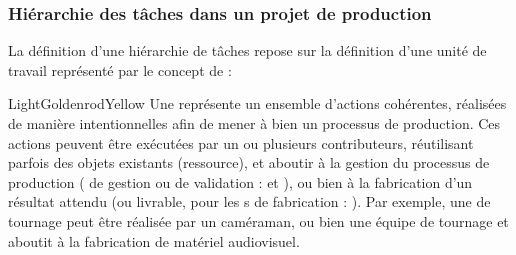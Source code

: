 \subsubsection{Hiérarchie des tâches dans un projet de production}\label{sec:mission}
La définition d'une hiérarchie de tâches repose sur la définition d'une unité de travail représenté par le concept de  : 

\begin{cadrecol}{LightGoldenrodYellow}
Une  représente un ensemble d'actions cohérentes, réalisées de manière intentionnelles afin de mener à bien un processus de production. 
Ces actions peuvent être exécutées par un ou plusieurs contributeurs, réutilisant parfois des objets existants (ressource), et aboutir à la gestion du processus de production ( de gestion ou de validation :  et ), ou bien à la fabrication d'un résultat attendu (ou livrable, pour les s de fabrication : ). 
Par exemple, une  de tournage peut être réalisée par un caméraman, ou bien une équipe de tournage et aboutit à la fabrication de matériel audiovisuel.
\end{cadrecol}

 

